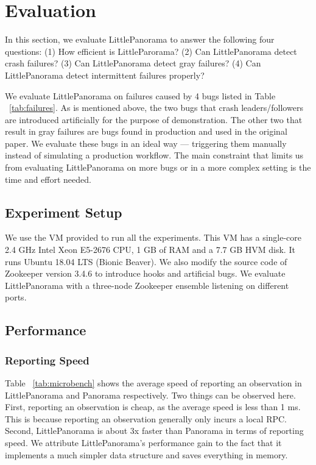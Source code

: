 \section{Evaluation}
\label{sec:eval}
In this section, we evaluate LittlePanorama to answer the following four questions: (1) How efficient is LittleParorama? (2) Can LittlePanorama detect crash failures? (3) Can LittlePanorama detect gray failures? (4) Can LittlePanorama detect intermittent failures properly?

We evaluate LittlePanorama on failures caused by 4 bugs listed in Table ~\ref{tab:failures}. As is mentioned above, the two bugs that crash leaders/followers are introduced artificially for the purpose of demonstration. The other two that result in gray failures are bugs found in production and used in the original paper. We evaluate these bugs in an ideal way --- triggering them manually instead of simulating a production workflow. The main constraint that limits us from evaluating LittlePanorama on more bugs or in a more complex setting is the time and effort needed. 





\subsection{Experiment Setup}
We use the VM provided to run all the experiments. This VM has a single-core 2.4 GHz Intel Xeon E5-2676 CPU, 1 GB of RAM and a 7.7 GB HVM disk. It runs Ubuntu 18.04 LTS (Bionic Beaver). We also modify the source code of Zookeeper version 3.4.6 to introduce hooks and artificial bugs. We evaluate LittlePanorama with a three-node Zookeeper ensemble listening on different ports.

\subsection{Performance}
\subsubsection{Reporting Speed} Table ~\ref{tab:microbench} shows the average speed of reporting an observation in LittlePanorama and Panorama respectively. Two things can be observed here. First, reporting an observation is cheap, as the average speed is less than 1 ms. This is because reporting an observation generally only incurs a local RPC. Second, LittlePanorama is about 3x faster than Panorama in terms of reporting speed. We attribute LittlePanorama's performance gain to the fact that it implements a much simpler data structure and saves everything in memory.

